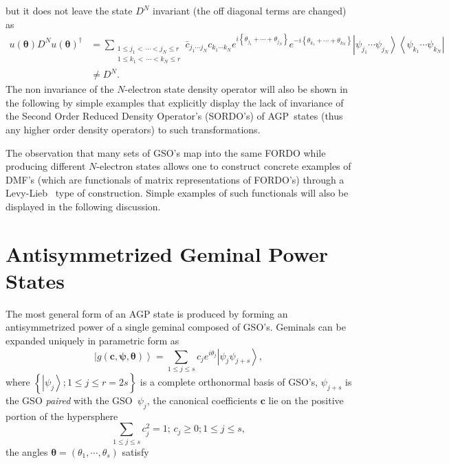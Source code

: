 \documentclass[aps,preprint]{revtex4}%
\begin{document}
but it does not leave the state $D^{N}$ invariant (the off diagonal terms are
changed) as
\begin{align}
u\left(  \boldsymbol{\theta}\right)  D^{N}u\left(  \boldsymbol{\theta}\right)
^{\dagger}  &  =\sum_{\substack{1\leq j_{1}<\,\cdots<j_{N}\leq r\\1\leq
k_{1}<\,\cdots<k_{N}\leq r}}\bar{c}_{j_{1}\cdots j_{N}}c_{k_{1}\cdots k_{N}%
}e^{i\left\{  \theta_{j_{1}}+\cdots+\theta_{j_{N}}\right\}  }e^{-i\left\{
\theta_{k_{1}}+\cdots+\theta_{k_{N}}\right\}  }\left\vert \psi_{j_{1}}%
\cdots\psi_{j_{N}}\right\rangle \left\langle \psi_{k_{1}}\cdots\psi_{k_{N}%
}\right\vert \nonumber\\
&  \neq D^{N}.
\end{align}
The non invariance of the $N$-electron state density operator will also be
shown in the following by simple examples that explicitly display the lack of
invariance of the Second Order Reduced Density Operator's (SORDO's) of
AGP\ states (thus any higher order density operators) to such transformations.

The observation that many sets of GSO's map into the same FORDO while
producing different $N$-electron states allows one to construct concrete
examples of DMF's (which are functionals of matrix representations of FORDO's)
through a Levy-Lieb \cite{Levy1979, Lieb1983}\ type of construction. Simple
examples of such functionals will also be displayed in the following discussion.

\section{Antisymmetrized Geminal Power States\label{AGP States}}

The most general form of an AGP state is produced by forming an
antisymmetrized power of a single geminal composed of GSO's. Geminals can be
expanded uniquely in parametric form as
\begin{equation}
\left\vert g\left(  \boldsymbol{c},\boldsymbol{\psi},\boldsymbol{\theta
}\right)  \right\rangle =\sum_{1\leq j\leq s}c_{j}e^{i\theta_{j}}\left\vert
\psi_{j}\psi_{j+s}\right\rangle , \label{gem}%
\end{equation}
where $\left\{  \left\vert \psi_{j}\right\rangle ;1\leq j\leq r=2s\right\}  $
is a complete orthonormal basis of GSO's, $\psi_{j+s}$ is the GSO
\emph{paired} with the GSO\ $\psi_{j}$, the canonical coefficients
$\mathbf{c}$ lie on the positive portion of the hypersphere
\begin{equation}
\sum\limits_{1\leq j\leq s}c_{j}^{2}=1;\,c_{j}\geq0;1\leq j\leq s,
\end{equation}
the angles $\boldsymbol{\theta}=\left(  \theta_{1},\cdots,\theta_{s}\right)  $ satisfy%
\end{document}
